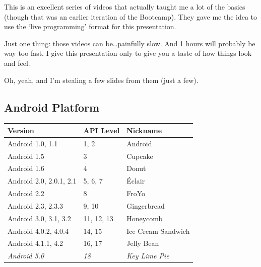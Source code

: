 \documentclass[a4paper,slides=slides,handouts=handouts]{mh-presentation}       %
\begin{document}
	\begin{summary}


		This is an excellent series of videos that actually taught me a lot of
		the basics (though that was an earlier iteration of the Bootcamp).
		They gave me the idea to use the `live programming' format for this
		presentation.
		
		Just one thing: those videos can be\ldots painfully slow. And 1
		hours will probably be way too fast. I give this presentation only to
		give you a taste of how things look and feel. 
		
		Oh, yeah, and I'm stealing a few slides from them (just a few).
	\end{summary}
	
\subsection{Android Platform}

	\begin{slide}
		\begin{tabular}{|l|l|l|}                                                    \hline
			\bfseries Version       & \bfseries API Level & \bfseries Nickname    \\\hline
			Android 1.0, 1.1        & 1, 2                & Android               \\\hline
			Android 1.5             & 3                   & Cupcake               \\\hline
			Android 1.6             & 4                   & Donut                 \\\hline
			Android 2.0, 2.0.1, 2.1 & 5, 6, 7             & \'Eclair              \\\hline
			Android 2.2             & 8                   & FroYo                 \\\hline
			Android 2.3, 2.3.3      & 9, 10               & Gingerbread           \\\hline
			Android 3.0, 3.1, 3.2   & 11, 12, 13          & Honeycomb             \\\hline
			Android 4.0.2, 4.0.4    & 14, 15              & Ice Cream Sandwich    \\\hline
			Android 4.1.1, 4.2      & 16, 17              & Jelly Bean            \\\hline
			\itshape Android 5.0    & \itshape 18         & \itshape Key Lime Pie \\\hline
		\end{tabular}
	\end{slide}
	
\end{document}
